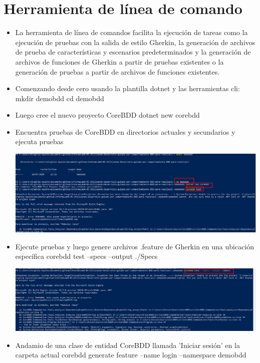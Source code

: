 \section{Herramienta de línea de comando} 
\begin{itemize}
\item La herramienta de línea de comandos facilita la ejecución de tareas como la ejecución de pruebas con la
salida de estilo Gherkin, la generación de archivos de prueba de características y escenarios
predeterminados y la generación de archivos de funciones de Gherkin a partir de pruebas existentes o la
generación de pruebas a partir de archivos de funciones existentes.
\item Comenzando desde cero usando la plantilla dotnet y las herramientas cli:
 mkdir demobdd
 cd demobdd
\item Luego cree el nuevo proyecto CoreBDD
 dotnet new corebdd
\item Encuentra pruebas de CoreBDD en directorios actuales y secundarios y ejecuta pruebas
\begin{center}
\includegraphics[width=\columnwidth]{images/6}\newline
\end{center}
\item Ejecute pruebas y luego genere archivos .feature de Gherkin en una ubicación específica
 corebdd test --specs --output ./Specs
\begin{center}
\includegraphics[width=\columnwidth]{images/7}\newline
\end{center}
\item Andamio de una clase de entidad CoreBDD llamada 'Iniciar sesión' en la carpeta actual
 corebdd generate feature --name login --namespace demobdd

\end{itemize}
